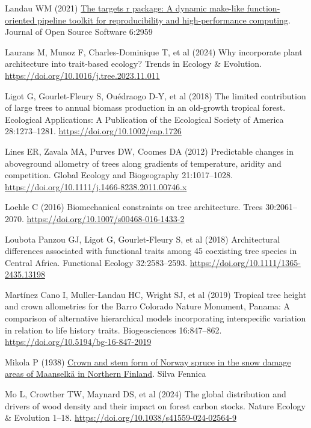 \documentclass[
  12pt,
  letterpaper,
  DIV=11,
  numbers=noendperiod]{scrartcl}
\newlength{\cslhangindent}
\newenvironment{CSLReferences}[2] %
 {\begin{list}{}{%
  \setlength{\itemindent}{0pt}
  \setlength{\leftmargin}{0pt}
  \setlength{\parsep}{0pt}
  \ifodd #1
   \setlength{\leftmargin}{\cslhangindent}
   \setlength{\itemindent}{-1\cslhangindent}
  \fi
  \setlength{\itemsep}{#2\baselineskip}}}
 {\end{list}}
\begin{document}
\begin{CSLReferences}{1}{1}
Landau WM (2021) \href{https://doi.org/10.21105/joss.02959}{The targets
r package: A dynamic make-like function-oriented pipeline toolkit for
reproducibility and high-performance computing}. Journal of Open Source
Software 6:2959

Laurans M, Munoz F, Charles-Dominique T, et al (2024) Why incorporate
plant architecture into trait-based ecology? Trends in Ecology \&
Evolution. \url{https://doi.org/10.1016/j.tree.2023.11.011}

Ligot G, Gourlet-Fleury S, Ouédraogo D-Y, et al (2018) The limited
contribution of large trees to annual biomass production in an
old-growth tropical forest. Ecological Applications: A Publication of
the Ecological Society of America 28:1273--1281.
\url{https://doi.org/10.1002/eap.1726}

Lines ER, Zavala MA, Purves DW, Coomes DA (2012) Predictable changes in
aboveground allometry of trees along gradients of temperature, aridity
and competition. Global Ecology and Biogeography 21:1017--1028.
\url{https://doi.org/10.1111/j.1466-8238.2011.00746.x}

Loehle C (2016) Biomechanical constraints on tree architecture. Trees
30:2061--2070. \url{https://doi.org/10.1007/s00468-016-1433-2}

Loubota Panzou GJ, Ligot G, Gourlet-Fleury S, et al (2018) Architectural
differences associated with functional traits among 45 coexisting tree
species in {Central} {Africa}. Functional Ecology 32:2583--2593.
\url{https://doi.org/10.1111/1365-2435.13198}

Martínez Cano I, Muller-Landau HC, Wright SJ, et al (2019) Tropical tree
height and crown allometries for the {Barro} {Colorado} {Nature}
{Monument}, {Panama}: A comparison of alternative hierarchical models
incorporating interspecific variation in relation to life history
traits. Biogeosciences 16:847--862.
\url{https://doi.org/10.5194/bg-16-847-2019}

Mikola P (1938) \href{https://www.silvafennica.fi/article/4546}{Crown
and stem form of {Norway} spruce in the snow damage areas of {Maanselkä}
in {Northern} {Finland}}. Silva Fennica

Mo L, Crowther TW, Maynard DS, et al (2024) The global distribution and
drivers of wood density and their impact on forest carbon stocks. Nature
Ecology \& Evolution 1--18.
\url{https://doi.org/10.1038/s41559-024-02564-9}


\end{CSLReferences}
\end{document}
